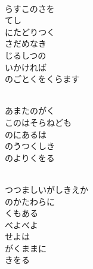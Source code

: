 \documentclass[10pt,b5j]{tarticle} %
\begin{document}
\begin{enumerate}
\begin{minipage}[c]{\blocksize}
        \vspace{\linespace}
        \item~\\
        らすこのさを\\
        てし\\
        にたどりつく\\
        さだめなき\\
        じるしつの\\
        いかければ\\
        のごとくをくらます
        
    \end{minipage}
    \begin{minipage}[c]{\blocksize}
        
        \vspace{\linespace}
        \item~\\
        あまたのがく\\
        このはそらねども\\
        のにあるは\\
        のうつくしき\\
        のよりくをる
        
    \end{minipage}
    \begin{minipage}[c]{\blocksize}
        
        \vspace{\linespace}
        \item~\\
        つつましいがしきえか\\
        のかたわらに\\
        くもある\\
        べよべよ\\
        せよは\\
        がくままに\\
        きをる
    
    \end{minipage}
\end{enumerate} %
\end{document}
